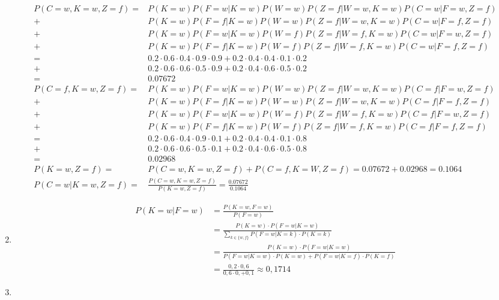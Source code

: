 \documentclass[a4paper,10pt]{article}
\begin{document}
\begin{enumerate}[~~a.)]
\begin{align*}
            P(C=w,K=w,Z=f)=&P(K=w)P(F=w|K=w)P(W=w)P(Z=f|W=w,K=w)P(C=w|F=w,Z=f)\\
            +&P(K=w)P(F=f|K=w)P(W=w)P(Z=f|W=w,K=w)P(C=w|F=f,Z=f)\\
            +&P(K=w)P(F=w|K=w)P(W=f)P(Z=f|W=f,K=w)P(C=w|F=w,Z=f)\\
            +&P(K=w)P(F=f|K=w)P(W=f)P(Z=f|W=f,K=w)P(C=w|F=f,Z=f)\\
            =&0.2\cdot 0.6\cdot 0.4\cdot 0.9\cdot 0.9+0.2\cdot 0.4\cdot 0.4\cdot 0.1\cdot 0.2\\
            +&0.2\cdot 0.6\cdot 0.6\cdot 0.5\cdot 0.9+0.2\cdot 0.4\cdot 0.6\cdot 0.5\cdot 0.2\\
            =& 0.07672\\
            P(C=f,K=w,Z=f)=&P(K=w)P(F=w|K=w)P(W=w)P(Z=f|W=w,K=w)P(C=f|F=w,Z=f)\\
            +&P(K=w)P(F=f|K=w)P(W=w)P(Z=f|W=w,K=w)P(C=f|F=f,Z=f)\\
            +&P(K=w)P(F=w|K=w)P(W=f)P(Z=f|W=f,K=w)P(C=f|F=w,Z=f)\\
            +&P(K=w)P(F=f|K=w)P(W=f)P(Z=f|W=f,K=w)P(C=f|F=f,Z=f)\\
            =&0.2\cdot 0.6\cdot 0.4\cdot 0.9\cdot 0.1+0.2\cdot 0.4\cdot 0.4\cdot 0.1\cdot 0.8\\
            +&0.2\cdot 0.6\cdot 0.6\cdot 0.5\cdot 0.1+0.2\cdot 0.4\cdot 0.6\cdot 0.5\cdot 0.8\\
            =& 0.02968\\
            P(K=w,Z=f)=&P(C=w,K=w,Z=f)+P(C=f,K=W,Z=f)=0.07672+0.02968=0.1064\\
            P(C=w|K=w,Z=f)=&\frac{P(C=w,K=w,Z=f)}{P(K=w,Z=f)} =\frac{0.07672}{0.1064}
            \end{align*}
        \item
            \begin{align*}
            P(K=w|F=w)&=\frac{P(K=w,F=w)}{P(F=w)}\\
            &=\frac{P(K=w)\cdot P(F=w|K=w)}{\sum\limits_{k\in \{w,f\}}^{} P(F=w|K=k) \cdot P(K=k)}\\
            &=\frac{P(K=w)\cdot P(F=w|K=w)}{P(F=w|K=w)\cdot P(K=w)+P(F=w|K=f)\cdot P(K=f)}\\
            &=\frac{0,2 \cdot 0,6}{0,6\cdot 0,+0,1} \approx 0,1714
            \end{align*}
        \item
    \end{enumerate}
\end{document}

